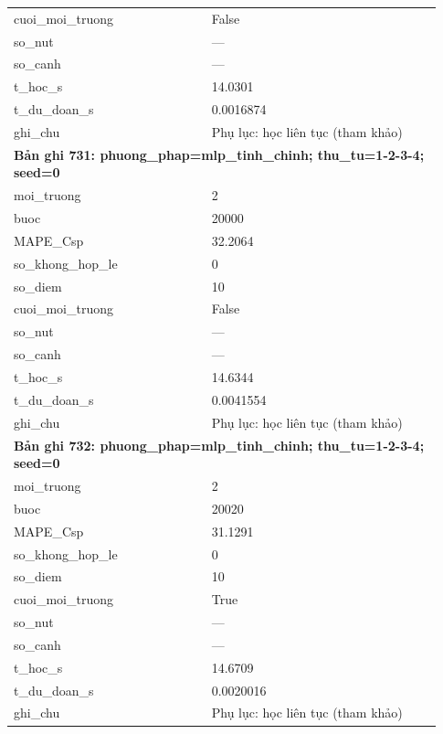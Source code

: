 \begin{longtable}{p{0.43\linewidth}p{0.50\linewidth}}
cuoi\_\allowbreak moi\_\allowbreak truong & False \\
so\_\allowbreak nut & — \\
so\_\allowbreak canh & — \\
t\_\allowbreak hoc\_\allowbreak s & 14.0301 \\
t\_\allowbreak du\_\allowbreak doan\_\allowbreak s & 0.0016874 \\
ghi\_\allowbreak chu & Phụ lục: học liên tục (tham khảo) \\
\midrule
\multicolumn{2}{p{0.95\linewidth}}{\textbf{Bản ghi 731: phuong\_phap=mlp\_tinh\_chinh; thu\_tu=1-2-3-4; seed=0}} \\
moi\_\allowbreak truong & 2 \\
buoc & 20000 \\
MAPE\_\allowbreak Csp & 32.2064 \\
so\_\allowbreak khong\_\allowbreak hop\_\allowbreak le & 0 \\
so\_\allowbreak diem & 10 \\
cuoi\_\allowbreak moi\_\allowbreak truong & False \\
so\_\allowbreak nut & — \\
so\_\allowbreak canh & — \\
t\_\allowbreak hoc\_\allowbreak s & 14.6344 \\
t\_\allowbreak du\_\allowbreak doan\_\allowbreak s & 0.0041554 \\
ghi\_\allowbreak chu & Phụ lục: học liên tục (tham khảo) \\
\midrule
\multicolumn{2}{p{0.95\linewidth}}{\textbf{Bản ghi 732: phuong\_phap=mlp\_tinh\_chinh; thu\_tu=1-2-3-4; seed=0}} \\
moi\_\allowbreak truong & 2 \\
buoc & 20020 \\
MAPE\_\allowbreak Csp & 31.1291 \\
so\_\allowbreak khong\_\allowbreak hop\_\allowbreak le & 0 \\
so\_\allowbreak diem & 10 \\
cuoi\_\allowbreak moi\_\allowbreak truong & True \\
so\_\allowbreak nut & — \\
so\_\allowbreak canh & — \\
t\_\allowbreak hoc\_\allowbreak s & 14.6709 \\
t\_\allowbreak du\_\allowbreak doan\_\allowbreak s & 0.0020016 \\
ghi\_\allowbreak chu & Phụ lục: học liên tục (tham khảo) \\

\end{longtable}
